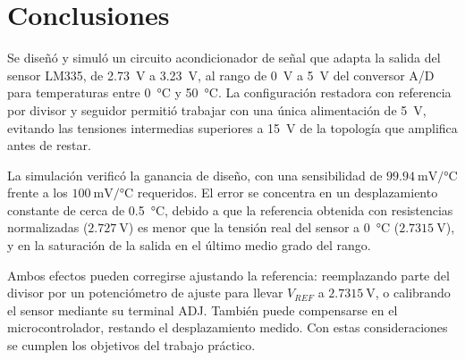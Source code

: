 \chapter{Conclusiones}
\label{sec:conclusiones}

Se diseñó y simuló un circuito acondicionador de señal que adapta la salida del sensor LM335, de \SI{2.73}{\volt} a
\SI{3.23}{\volt}, al rango de \SI{0}{\volt} a \SI{5}{\volt} del conversor A/D para temperaturas entre
\SI{0}{\celsius} y \SI{50}{\celsius}. La configuración restadora con referencia por divisor y seguidor permitió
trabajar con una única alimentación de \SI{5}{\volt}, evitando las tensiones intermedias superiores a \SI{15}{\volt}
de la topología que amplifica antes de restar.

La simulación verificó la ganancia de diseño, con una sensibilidad de $\SI{99.94}{\milli\volt/\celsius}$ frente a los
$\SI{100}{\milli\volt/\celsius}$ requeridos. El error se concentra en un desplazamiento constante de cerca de
\SI{0.5}{\celsius}, debido a que la referencia obtenida con resistencias normalizadas ($\SI{2.727}{\volt}$) es menor
que la tensión real del sensor a \SI{0}{\celsius} ($\SI{2.7315}{\volt}$), y en la saturación de la salida en el último
medio grado del rango.

Ambos efectos pueden corregirse ajustando la referencia: reemplazando parte del divisor por un potenciómetro de ajuste
para llevar $V_{REF}$ a $\SI{2.7315}{\volt}$, o calibrando el sensor mediante su terminal ADJ. También puede
compensarse en el microcontrolador, restando el desplazamiento medido. Con estas consideraciones se cumplen los
objetivos del trabajo práctico.

